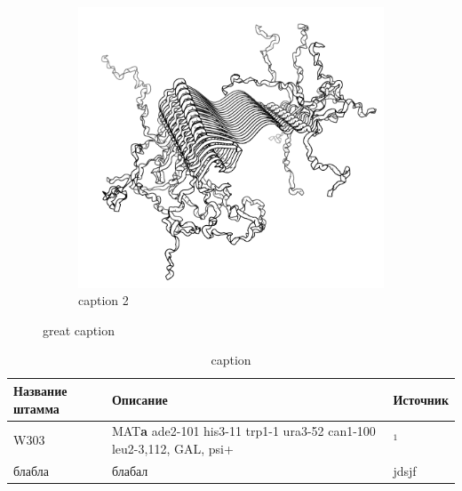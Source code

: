 \begin{figure}[h]
\begin{subfigure}[t]{0.1\linewidth}
		\includegraphics[width = \textwidth]{pics/beta_struct.png}
		\caption{caption 2}\label{fig:beta}

	\end{subfigure}
	\caption{great caption}
	\label{fig:structs}
	
\end{figure}



\begin{table}[p]
	\small
	\caption{caption}
	\label{table:strains}
	\begin{tabular}{ p{0.25\width - \tabcolsep} p{0.65\width - 2\tabcolsep}  p{0.1\width - \tabcolsep}}
		\graytable
		\toprule
		Название штамма & Описание & Источник \\ 
		\midrule
		W303 & MAT\textbf{a} ade2-101 his3-11 trp1-1 ura3-52 can1-100 leu2-3,112, GAL, psi+ & $^1$ \\  \invisiblerule
		\midrule

		
		блабла & блабал & jdsjf \\
		\bottomrule
	\end{tabular}
	
\end{table}


